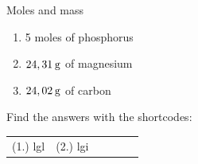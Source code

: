 \begin{exercises}{Moles and mass
      }
\begin{enumerate}[noitemsep, label=\textbf{\arabic*}. ]
\begin{enumerate}[noitemsep, label=\textbf{\alph*}. ]
\label{m38717*uid6}\item 5 moles of phosphorus
\label{m38717*uid7}\item $24,31\phantom{\rule{2pt}{0ex}}\mathrm{g}$ of magnesium
\label{m38717*uid8}\item $24,02\phantom{\rule{2pt}{0ex}}\mathrm{g}$ of carbon
\end{enumerate}
                \end{enumerate}
    \label{m38717*cid3}
\par {} Find the answers with the shortcodes:
 \par \begin{tabular}[h]{cccccc}
 (1.) lgl  &  (2.) lgi  & \end{tabular}
\end{exercises}

